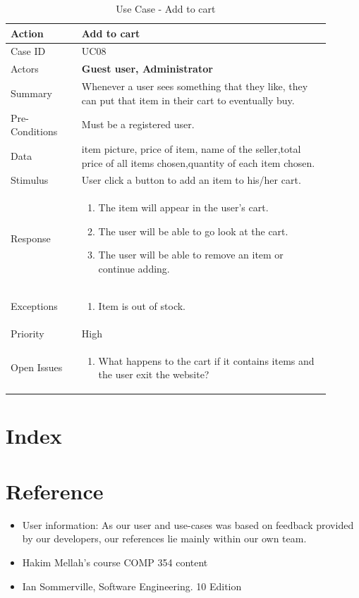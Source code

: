 \documentclass[11pt]{article}
\newcounter{use case ID}
\newcommand\tabularhead[1]{
    \begin{table}[ht]
        \addtocounter{use case ID}{1}
        \caption{Use Case \arabic{use case ID} - #1}
        \vspace{0.2cm}
        \begin{tabular}{|p{0.2\linewidth}|p{0.70\linewidth}|}
            \hline
            \textbf{Action} & \textbf{#1} \\
            \hline}
\newcommand\addrow[2]{#1 & #2\\ \hline}
\newcommand\addmulrow[2]{ \begin{minipage}[t][][t]{2.5cm}#1\end{minipage}
                &\begin{minipage}[t][][t]{11cm}
                    \begin{enumerate}[itemsep=-1ex] #2   \end{enumerate}
                \end{minipage}\vfill\\ \hline}
\newenvironment{usecase}{\tabularhead}
        {\hline\end{tabular}\end{table}}
\begin{document}
\begin{usecase}{Add to cart}
    \addrow{Case ID}{UC08}
    \addrow{Actors}{\textbf{Guest user, Administrator}}
    \addrow{Summary}{Whenever a user sees something that they like, they can put that item in their cart to eventually buy.}
    \addrow{Pre-Conditions}{
       Must be a \index{registered user}registered user.
        }
    \addrow{\index{data}Data}{
item picture, price of item, name of the \index{seller}seller,total price of all items chosen,quantity of each item chosen.}
    \addrow{Stimulus}{User click a button to add an item to his/her cart.}
    \addmulrow{Response}{
        \item The item will appear in the user's cart.
        \item The user will be able to go look at the cart.
        \item The user will be able to remove an item or continue adding.
    }
    \addmulrow{Exceptions}{
        \item Item is out of stock.
    }
    \addrow{Priority}{High}
    \addmulrow{Open Issues}{
        \item What happens to the cart if it contains items and the user exit the website?
    }
\end{usecase}
\clearpage


\section{Index}

\printindex


\section{Reference}

\begin{itemize}
    \item User information: As our user and use-cases was based on feedback provided by our developers, our references lie mainly within our own team.
    \item Hakim Mellah's course COMP 354 content
    \item Ian Sommerville, Software Engineering. 10 Edition
\end{itemize}
\end{document}
